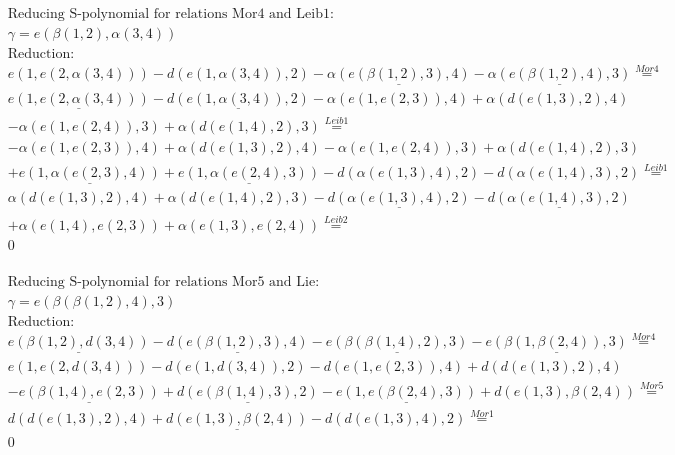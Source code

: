 \documentclass[11pt]{amsart}
\begin{document}
\begin{align*} 
& \text{Reducing S-polynomial for relations Mor4 and Leib1:} \\ 
& \gamma = e(\beta(1,2),\alpha(3,4)) \\ 
& \text{Reduction}: \\&e(1,e(2,\alpha(3,4))) - d(e(1,\alpha(3,4)),2) - \underline{\alpha(e(\beta(1,2),3),4)} - \underline{\alpha(e(\beta(1,2),4),3)} \stackrel{ Mor4 }{=}  \\ 
&\underline{e(1,e(2,\alpha(3,4)))} - \underline{d(e(1,\alpha(3,4)),2)} - \alpha(e(1,e(2,3)),4) + \alpha(d(e(1,3),2),4)\\ 
 &  - \alpha(e(1,e(2,4)),3) + \alpha(d(e(1,4),2),3) \stackrel{ Leib1 }{=}  \\ 
& - \alpha(e(1,e(2,3)),4) + \alpha(d(e(1,3),2),4) - \alpha(e(1,e(2,4)),3) + \alpha(d(e(1,4),2),3)\\ 
 &  + \underline{e(1,\alpha(e(2,3),4))} + \underline{e(1,\alpha(e(2,4),3))} - d(\alpha(e(1,3),4),2) - d(\alpha(e(1,4),3),2) \stackrel{ Leib1 }{=}  \\ 
&\alpha(d(e(1,3),2),4) + \alpha(d(e(1,4),2),3) - \underline{d(\alpha(e(1,3),4),2)} - \underline{d(\alpha(e(1,4),3),2)}\\ 
 &  + \alpha(e(1,4),e(2,3)) + \alpha(e(1,3),e(2,4)) \stackrel{ Leib2 }{=}  \\ 
&0\\ 
\end{align*} 
 
\begin{align*} 
& \text{Reducing S-polynomial for relations Mor5 and Lie:} \\ 
& \gamma = e(\beta(\beta(1,2),4),3) \\ 
& \text{Reduction}: \\&\underline{e(\beta(1,2),d(3,4))} - \underline{d(e(\beta(1,2),3),4)} - \underline{e(\beta(\beta(1,4),2),3)} - \underline{e(\beta(1,\beta(2,4)),3)} \stackrel{ Mor4 }{=}  \\ 
&e(1,e(2,d(3,4))) - d(e(1,d(3,4)),2) - d(e(1,e(2,3)),4) + d(d(e(1,3),2),4)\\ 
 &  - \underline{e(\beta(1,4),e(2,3))} + \underline{d(e(\beta(1,4),3),2)} - \underline{e(1,e(\beta(2,4),3))} + d(e(1,3),\beta(2,4)) \stackrel{ Mor5 }{=}  \\ 
&d(d(e(1,3),2),4) + \underline{d(e(1,3),\beta(2,4))} - d(d(e(1,3),4),2) \stackrel{ Mor1 }{=}  \\ 
&0\\ 
\end{align*} 
 
\end{document}
